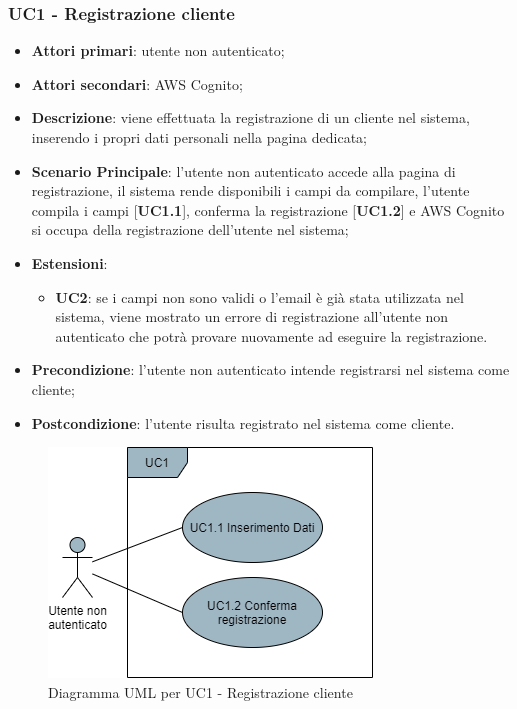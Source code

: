 \subsubsection{UC1 - Registrazione cliente}
\begin{itemize}
\item \textbf{Attori primari}: utente non autenticato;
\item \textbf{Attori secondari}: AWS Cognito;
\item \textbf{Descrizione}: viene effettuata la registrazione di un cliente nel sistema, inserendo i propri dati personali nella pagina dedicata;
\item \textbf{Scenario Principale}: l'utente non autenticato accede alla pagina di registrazione, il sistema rende disponibili i campi da compilare, l'utente compila i campi [\textbf{UC1.1}], conferma la registrazione [\textbf{UC1.2}] e AWS Cognito si occupa della registrazione dell'utente nel sistema;
\item \textbf{Estensioni}:
\begin{itemize}
\item \textbf{UC2}: se i campi non sono validi o l'email è già stata utilizzata nel sistema, viene mostrato un errore di registrazione all'utente non autenticato che potrà provare nuovamente ad eseguire la registrazione.
\end{itemize}
\item \textbf{Precondizione}: l'utente non autenticato intende registrarsi nel sistema come cliente;
\item \textbf{Postcondizione}: l'utente risulta registrato nel sistema come cliente.
\end{itemize}

\begin{figure}[H]
\centering
\includegraphics[scale=0.6]{res/UseCase/Immagini/Registrazione}
\caption{Diagramma UML per UC1 - Registrazione cliente}
\end{figure}

